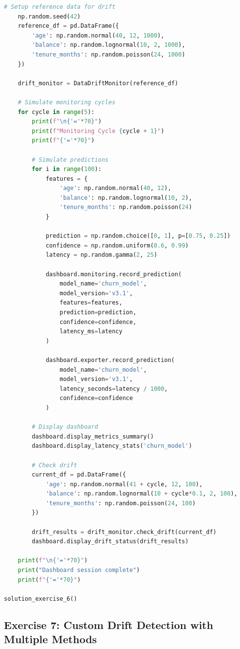 \begin{lstlisting}[language=Python]
    # Setup reference data for drift
    np.random.seed(42)
    reference_df = pd.DataFrame({
        'age': np.random.normal(40, 12, 1000),
        'balance': np.random.lognormal(10, 2, 1000),
        'tenure_months': np.random.poisson(24, 1000)
    })

    drift_monitor = DataDriftMonitor(reference_df)

    # Simulate monitoring cycles
    for cycle in range(5):
        print(f"\n{'='*70}")
        print(f"Monitoring Cycle {cycle + 1}")
        print(f"{'='*70}")

        # Simulate predictions
        for i in range(100):
            features = {
                'age': np.random.normal(40, 12),
                'balance': np.random.lognormal(10, 2),
                'tenure_months': np.random.poisson(24)
            }

            prediction = np.random.choice([0, 1], p=[0.75, 0.25])
            confidence = np.random.uniform(0.6, 0.99)
            latency = np.random.gamma(2, 25)

            dashboard.monitoring.record_prediction(
                model_name='churn_model',
                model_version='v3.1',
                features=features,
                prediction=prediction,
                confidence=confidence,
                latency_ms=latency
            )

            dashboard.exporter.record_prediction(
                model_name='churn_model',
                model_version='v3.1',
                latency_seconds=latency / 1000,
                confidence=confidence
            )

        # Display dashboard
        dashboard.display_metrics_summary()
        dashboard.display_latency_stats('churn_model')

        # Check drift
        current_df = pd.DataFrame({
            'age': np.random.normal(41 + cycle, 12, 100),
            'balance': np.random.lognormal(10 + cycle*0.1, 2, 100),
            'tenure_months': np.random.poisson(24, 100)
        })

        drift_results = drift_monitor.check_drift(current_df)
        dashboard.display_drift_status(drift_results)

    print(f"\n{'='*70}")
    print("Dashboard session complete")
    print(f"{'='*70}")

solution_exercise_6()
\end{lstlisting}

\subsection{Exercise 7: Custom Drift Detection with Multiple Methods}

